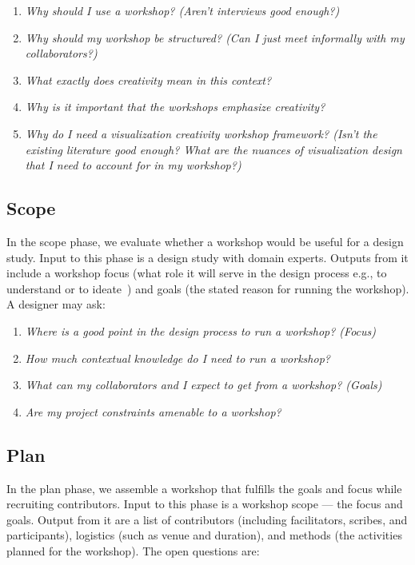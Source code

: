 \begin{enumerate}
    \item \emph{Why should I use a workshop? (Aren't interviews good enough?)}
    \item \emph{Why should my workshop be structured? (Can I just meet informally with my collaborators?)}
    \item \emph{What exactly does creativity mean in this context?}
    \item \emph{Why is it important that the workshops emphasize creativity?}
    \item \emph{Why do I need a \emph{visualization} creativity workshop framework? (Isn't the existing literature good enough? What are the nuances of visualization design that I need to account for in my workshop?)}
\end{enumerate}

\subsection*{Scope}

In the scope phase, we evaluate whether a workshop would be useful for a design study. Input to this phase is a design study with domain experts. Outputs from it include a workshop focus (what role it will serve in the design process e.g., to understand or to ideate~\cite{McKenna2014}) and goals (the stated reason for running the workshop). A designer may ask:

\begin{enumerate}
    \item \emph{Where is a good point in the design process to run a workshop? (Focus)}
    \item \emph{How much contextual knowledge do I need to run a workshop?}
    \item \emph{What can my collaborators and I expect to get from a workshop? (Goals)}
    \item \emph{Are my project constraints amenable to a workshop?}
\end{enumerate}

\subsection*{Plan}

In the plan phase, we assemble a workshop that fulfills the goals and focus while recruiting contributors. Input to this phase is a workshop scope --- the focus and goals. Output from it are a list of contributors (including facilitators, scribes, and participants), logistics (such as venue and duration), and methods (the activities planned for the workshop). The open questions are:

